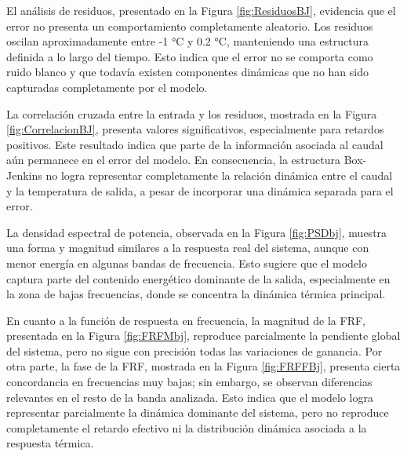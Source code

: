\documentclass[11pt]{report}
\begin{document}
El análisis de residuos, presentado en la Figura \ref{fig:ResiduosBJ}, evidencia que el error no presenta un comportamiento completamente aleatorio. Los residuos oscilan aproximadamente entre -1 °C y 0.2 °C, manteniendo una estructura definida a lo largo del tiempo. Esto indica que el error no se comporta como ruido blanco y que todavía existen componentes dinámicas que no han sido capturadas completamente por el modelo.

La correlación cruzada entre la entrada y los residuos, mostrada en la Figura \ref{fig:CorrelacionBJ}, presenta valores significativos, especialmente para retardos positivos. Este resultado indica que parte de la información asociada al caudal aún permanece en el error del modelo. En consecuencia, la estructura Box-Jenkins no logra representar completamente la relación dinámica entre el caudal y la temperatura de salida, a pesar de incorporar una dinámica separada para el error.

La densidad espectral de potencia, observada en la Figura \ref{fig:PSDbj}, muestra una forma y magnitud similares a la respuesta real del sistema, aunque con menor energía en algunas bandas de frecuencia. Esto sugiere que el modelo captura parte del contenido energético dominante de la salida, especialmente en la zona de bajas frecuencias, donde se concentra la dinámica térmica principal.

En cuanto a la función de respuesta en frecuencia, la magnitud de la FRF, presentada en la Figura \ref{fig:FRFMbj}, reproduce parcialmente la pendiente global del sistema, pero no sigue con precisión todas las variaciones de ganancia. Por otra parte, la fase de la FRF, mostrada en la Figura \ref{fig:FRFFBj}, presenta cierta concordancia en frecuencias muy bajas; sin embargo, se observan diferencias relevantes en el resto de la banda analizada. Esto indica que el modelo logra representar parcialmente la dinámica dominante del sistema, pero no reproduce completamente el retardo efectivo ni la distribución dinámica asociada a la respuesta térmica.
\end{document}
